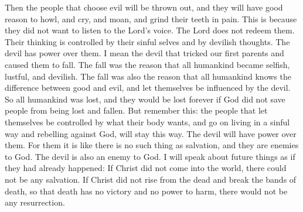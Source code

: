Then the people that choose evil will be thrown out, and they will have good reason to howl, and cry, and moan, and grind their teeth in pain. This is because they did not want to listen to the Lord's voice. The Lord does not redeem them.
\bverse \iffalse For they are carnal and devilish, and the devil has power over them; yea, even that old serpent that did beguile our first parents, which was the cause of their fall; which was the cause of all mankind becoming carnal, sensual, devilish, knowing evil from good, subjecting themselves to the devil. \fi
Their thinking is controlled by their sinful selves and by devilish thoughts. The devil has power over them. I mean the devil that tricked our first parents and caused them to fall. The fall was the reason that all humankind became selfish, lustful, and devilish. The fall was also the reason that all humankind knows the difference between good and evil, and let themselves be influenced by the devil.
\bverse \iffalse Thus all mankind were lost; and behold, they would have been endlessly lost were it not that God redeemed his people from their lost and fallen state. \fi
So all humankind was lost, and they would be lost forever if God did not save \Gpposs people from being lost and fallen.
\bverse \iffalse But remember that he that persists in his own carnal nature, and goes on in the ways of sin and rebellion against God, remaineth in his fallen state and the devil hath all power over him. Therefore, he is as though there was no redemption made, being an enemy to God; and also is the devil an enemy to God. \fi
But remember this: the people that let themselves be controlled by what their body wants, and go on living in a sinful way and rebelling against God, will stay this way. The devil will have power over them. For them it is like there is no such thing as salvation, and they are enemies to God. The devil is also an enemy to God.
\bverse \iffalse And now if Christ had not come into the world, speaking of things to come as though they had already come, there could have been no redemption. \fi
I will speak about future things as if they had already happened: If Christ did not come into the world, there could not be any salvation.
\bverse \iffalse And if Christ had not risen from the dead, or have broken the bands of death that the grave should have no victory, and that death should have no sting, there could have been no resurrection. \fi
If Christ did not rise from the dead and break the bands of death, so that death has no victory and no power to harm, there would not be any resurrection.
